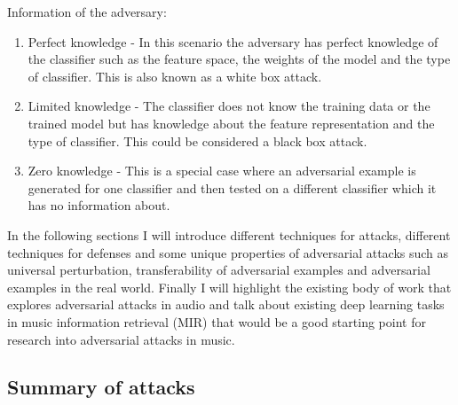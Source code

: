 \documentclass[journal,onecolumn]{IEEEtran}
\begin{document}
Information of the adversary:
\begin{enumerate}
\item Perfect knowledge - In this scenario the adversary has perfect knowledge of the classifier such as the feature space, the weights of the model and the type of classifier. This is also known as a white box attack.
\item Limited knowledge - The classifier does not know the training data or the trained model but has knowledge about the feature representation and the type of classifier. This could be considered a black box attack.
\item Zero knowledge - This is a special case where an adversarial example is generated for one classifier and then tested on a different classifier which it has no information about.
\end{enumerate}

In the following sections I will introduce different techniques for attacks, different techniques for defenses and some unique properties of adversarial attacks such as universal perturbation, transferability of adversarial examples and adversarial examples in the real world. Finally I will highlight the existing body of work that explores adversarial attacks in audio and talk about existing deep learning tasks in music information retrieval (MIR) that would be a good starting point for research into adversarial attacks in music.


\subsection{Summary of attacks}
\end{document}
